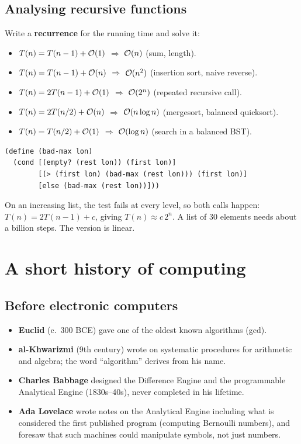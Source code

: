 \subsection{Analysing recursive functions}
Write a \textbf{recurrence} for the running time and solve it:
\begin{itemize}
  \item $T(n) = T(n-1) + \mathcal{O}(1)$ $\Rightarrow$ $\mathcal{O}(n)$ (sum, length).
  \item $T(n) = T(n-1) + \mathcal{O}(n)$ $\Rightarrow$ $\mathcal{O}(n^2)$ (insertion sort, naive reverse).
  \item $T(n) = 2T(n-1) + \mathcal{O}(1)$ $\Rightarrow$ $\mathcal{O}(2^n)$ (repeated recursive call).
  \item $T(n) = 2T(n/2) + \mathcal{O}(n)$ $\Rightarrow$ $\mathcal{O}(n \log n)$ (mergesort, balanced quicksort).
  \item $T(n) = T(n/2) + \mathcal{O}(1)$ $\Rightarrow$ $\mathcal{O}(\log n)$ (search in a balanced BST).
\end{itemize}

\begin{example}
\begin{lstlisting}[style=racket]
(define (bad-max lon)
  (cond [(empty? (rest lon)) (first lon)]
        [(> (first lon) (bad-max (rest lon))) (first lon)]
        [else (bad-max (rest lon))]))
\end{lstlisting}
On an increasing list, the test fails at every level, so both calls
happen: $T(n) = 2T(n-1) + c$, giving $T(n) \approx c\,2^n$. A list of 30
elements needs about a billion steps. The  version is linear.
\end{example}

\section{A short history of computing}

\subsection{Before electronic computers}
\begin{itemize}
  \item \textbf{Euclid} (c.\ 300 BCE) gave one of the oldest known algorithms (gcd).
  \item \textbf{al-Khwarizmi} (9th century) wrote on systematic procedures for arithmetic and algebra; the word ``algorithm'' derives from his name.
  \item \textbf{Charles Babbage} designed the Difference Engine and the programmable Analytical Engine (1830s--40s), never completed in his lifetime.
  \item \textbf{Ada Lovelace} wrote notes on the Analytical Engine including what is considered the first published program (computing Bernoulli numbers), and foresaw that such machines could manipulate symbols, not just numbers.
\end{itemize}

